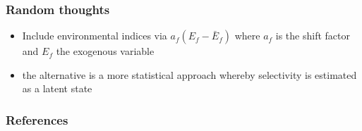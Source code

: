 \documentclass{beamer}
\begin{document}

\begin{frame}
\frametitle{Random thoughts}
\begin{itemize}
\item Include environmental indices via $a_f (E_f - \bar{E}_f)$ where $a_f$ is
  the shift factor and $E_f$ the exogenous variable
\item the alternative is a more statistical approach whereby selectivity is
  estimated as a latent state
\end{itemize}
\end{frame}


\begin{frame}
\frametitle{References}


\end{frame}

\end{document}

